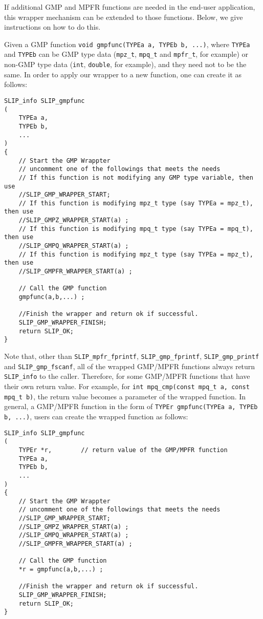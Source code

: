 \documentclass[12pt]{article}
\theoremstyle{definition}
\begin{document}
If additional GMP and MPFR functions are needed in the end-user application,
this wrapper mechanism can be extended to those functions.  Below, we give
instructions on how to do this.

Given a GMP function \verb|void gmpfunc(TYPEa a, TYPEb b, ...)|, where
\verb|TYPEa| and \verb|TYPEb| can be GMP type data (\verb|mpz_t|,
\verb|mpq_t| and \verb|mpfr_t|, for example) or non-GMP type data (\verb|int|,
\verb|double|, for example), and they need not to be the same. In order to
apply our wrapper to a new function, one can create it as follows:

\begin{mdframed}[userdefinedwidth=6in]
{\footnotesize
\begin{verbatim}
SLIP_info SLIP_gmpfunc
(
    TYPEa a,
    TYPEb b,
    ...
)
{
    // Start the GMP Wrappter
    // uncomment one of the followings that meets the needs
    // If this function is not modifying any GMP type variable, then use
    //SLIP_GMP_WRAPPER_START;
    // If this function is modifying mpz_t type (say TYPEa = mpz_t), then use
    //SLIP_GMPZ_WRAPPER_START(a) ;
    // If this function is modifying mpq_t type (say TYPEa = mpq_t), then use
    //SLIP_GMPQ_WRAPPER_START(a) ;
    // If this function is modifying mpz_t type (say TYPEa = mpz_t), then use
    //SLIP_GMPFR_WRAPPER_START(a) ;

    // Call the GMP function
    gmpfunc(a,b,...) ;

    //Finish the wrapper and return ok if successful.
    SLIP_GMP_WRAPPER_FINISH;
    return SLIP_OK;
}
\end{verbatim}
} \end{mdframed}

Note that, other than \verb|SLIP_mpfr_fprintf|, \verb|SLIP_gmp_fprintf|,
\verb|SLIP_gmp_printf| and \verb|SLIP_gmp_fscanf|, all of the wrapped GMP/MPFR
functions always return \verb|SLIP_info| to the caller. Therefore, for some
GMP/MPFR functions that have their own return value.  For example, for
\verb|int mpq_cmp(const mpq_t a, const mpq_t b)|, the return value becomes a
parameter of the wrapped function. In general, a GMP/MPFR function in the form
of \verb|TYPEr gmpfunc(TYPEa a, TYPEb b, ...)|, users can create the wrapped
function as follows:

\begin{mdframed}[userdefinedwidth=6in]
{\footnotesize
\begin{verbatim}
SLIP_info SLIP_gmpfunc
(
    TYPEr *r,        // return value of the GMP/MPFR function
    TYPEa a,
    TYPEb b,
    ...
)
{
    // Start the GMP Wrappter
    // uncomment one of the followings that meets the needs
    //SLIP_GMP_WRAPPER_START;
    //SLIP_GMPZ_WRAPPER_START(a) ;
    //SLIP_GMPQ_WRAPPER_START(a) ;
    //SLIP_GMPFR_WRAPPER_START(a) ;

    // Call the GMP function
    *r = gmpfunc(a,b,...) ;

    //Finish the wrapper and return ok if successful.
    SLIP_GMP_WRAPPER_FINISH;
    return SLIP_OK;
}
\end{verbatim}
} \end{mdframed}
\end{document}
